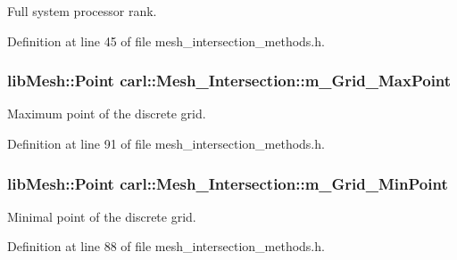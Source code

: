 Full system processor rank. 



Definition at line 45 of file mesh\+\_\+intersection\+\_\+methods.\+h.

\hypertarget{classcarl_1_1_mesh___intersection_a98f86004df38485ed880b054b94f5c7d}{}
\subsubsection[{m\+\_\+\+Grid\+\_\+\+Max\+Point}]{\setlength{\rightskip}{0pt plus 5cm}lib\+Mesh\+::\+Point carl\+::\+Mesh\+\_\+\+Intersection\+::m\+\_\+\+Grid\+\_\+\+Max\+Point\hspace{0.3cm}{\ttfamily [protected]}}\label{classcarl_1_1_mesh___intersection_a98f86004df38485ed880b054b94f5c7d}


Maximum point of the discrete grid. 



Definition at line 91 of file mesh\+\_\+intersection\+\_\+methods.\+h.

\hypertarget{classcarl_1_1_mesh___intersection_a415abd921fae83d405751d1dcc0957db}{}
\subsubsection[{m\+\_\+\+Grid\+\_\+\+Min\+Point}]{\setlength{\rightskip}{0pt plus 5cm}lib\+Mesh\+::\+Point carl\+::\+Mesh\+\_\+\+Intersection\+::m\+\_\+\+Grid\+\_\+\+Min\+Point\hspace{0.3cm}{\ttfamily [protected]}}\label{classcarl_1_1_mesh___intersection_a415abd921fae83d405751d1dcc0957db}


Minimal point of the discrete grid. 



Definition at line 88 of file mesh\+\_\+intersection\+\_\+methods.\+h.

\hypertarget{classcarl_1_1_mesh___intersection_a74b7064e400e0dbf8c62eb7efef1b784}{}
